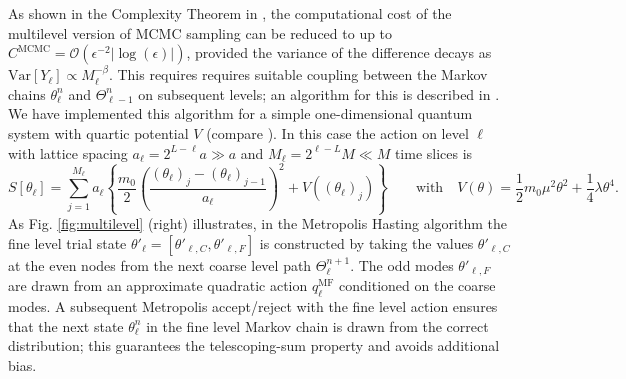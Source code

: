 \documentclass[11pt]{article}
\begin{document}
As shown in the Complexity Theorem in \cite{Dodwell2015}, the computational cost of the multilevel version of MCMC sampling can be reduced to up to $C^{\text{MCMC}}=\mathcal{O}(\epsilon^{-2}|\log(\epsilon)|)$, provided the variance of the difference decays as $\text{Var}[Y_\ell]\propto M_\ell^{-\beta}$. This requires requires suitable coupling between the Markov chains $\theta_\ell^n$ and $\Theta_{\ell-1}^n$ on subsequent levels; an algorithm for this is described in \cite{Dodwell2015}. We have implemented this algorithm for a simple one-dimensional quantum system with quartic potential $V$ (compare \cite{Creutz1981}). In this case the action on level $\ell$ with lattice spacing $a_\ell=2^{L-\ell}a \gg a$ and $M_\ell=2^{\ell-L}M \ll M$ time slices is
\begin{equation}
  S\left[\theta_\ell\right] = \sum_{j=1}^{M_\ell} a_\ell\left\{\frac{m_0}{2}\left(\frac{(\theta_\ell)_j-(\theta_\ell)_{j-1}}{a_\ell}\right)^2 + V\left((\theta_\ell)_j\right)\right\}\qquad \text{with}\quad V(\theta) = \frac{1}{2}m_0\mu^2\theta^2+\frac{1}{4}\lambda\theta^4.\label{eqn:quantum_action}
\end{equation}
As Fig. \ref{fig:multilevel} (right) illustrates, in the Metropolis Hasting algorithm the fine level trial state $\theta'_\ell=[\theta'_{\ell,C},\theta'_{\ell,F}]$ is constructed by taking the values $\theta'_{\ell,C}$ at the even nodes from the next coarse level path $\Theta_\ell^{n+1}$. The odd modes $\theta'_{\ell,F}$ are drawn from an approximate quadratic action $q_{\ell}^{\text{MF}}$ conditioned on the coarse modes. A subsequent Metropolis accept/reject with the fine level action ensures that the next state $\theta_\ell^n$ in the fine level Markov chain is drawn from the correct distribution; this guarantees the telescoping-sum property and avoids additional bias.
\end{document}
